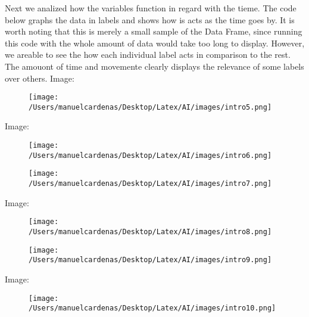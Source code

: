 \documentclass{article}
\begin{document}
    Next we analized how the variables function in regard with the tieme. The code below graphs the data in labels 
    and shows how is acts as the time goes by. It is worth noting that this is merely a small sample of the Data Frame, 
    since running this code with the whole amount of data would take too long to display. However, we areable to see the 
    how each individual label acts in comparison to the rest. The amouont of time and movemente clearly displays the 
    relevance of some labels over others. Image:\pagebreak
    \begin{figure}[h]
        \centering
        \texttt{[image: /Users/manuelcardenas/Desktop/Latex/AI/images/intro5.png]}
        \label{fig:intro5}
    \end{figure}

    Image:\pagebreak

    \begin{figure}[h]
        \centering
        \texttt{[image: /Users/manuelcardenas/Desktop/Latex/AI/images/intro6.png]}
        \label{fig:intro6}
    \end{figure}

    

    \begin{figure}[h]
        \centering
        \texttt{[image: /Users/manuelcardenas/Desktop/Latex/AI/images/intro7.png]}
        \label{fig:intro7}
    \end{figure}

    Image:\pagebreak

    \begin{figure}[h]
        \centering
        \texttt{[image: /Users/manuelcardenas/Desktop/Latex/AI/images/intro8.png]}
        \label{fig:intro8}
    \end{figure}

    

    \begin{figure}[h]
        \centering
        \texttt{[image: /Users/manuelcardenas/Desktop/Latex/AI/images/intro9.png]}
        \label{fig:intro9}
    \end{figure}

    Image:\pagebreak

    \begin{figure}[h]
        \centering
        \texttt{[image: /Users/manuelcardenas/Desktop/Latex/AI/images/intro10.png]}
        \label{fig:intro10}
    \end{figure}
\end{document}
